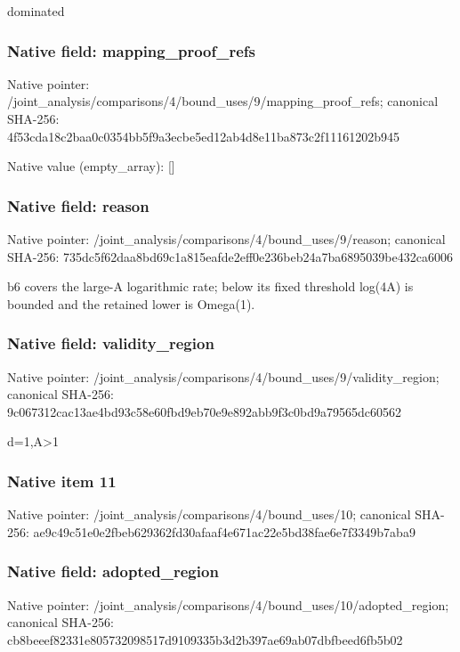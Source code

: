 \documentclass[10pt,a4paper]{article}
\begin{document}
\begingroup\raggedright\sloppy dominated\par\endgroup

\subsubsection{Native field: mapping\_\allowbreak{}proof\_\allowbreak{}refs}
Native pointer: /joint\_\allowbreak{}analysis/comparisons/4/bound\_\allowbreak{}uses/9/mapping\_\allowbreak{}proof\_\allowbreak{}refs; canonical SHA-256: 4f53cda18c2baa0c0354bb5f9a3ecbe5ed12ab4d8e11ba873c2f11161202b945

Native value (empty\_\allowbreak{}array): []

\subsubsection{Native field: reason}
Native pointer: /joint\_\allowbreak{}analysis/comparisons/4/bound\_\allowbreak{}uses/9/reason; canonical SHA-256: 735dc5f62daa8bd69c1a815eafde2eff0e236beb24a7ba6895039be432ca6006

\begingroup\raggedright\sloppy b6 covers the large-A logarithmic rate;\allowbreak{} below its fixed threshold log(4A) is bounded and the retained lower is Omega(1).\par\endgroup

\subsubsection{Native field: validity\_\allowbreak{}region}
Native pointer: /joint\_\allowbreak{}analysis/comparisons/4/bound\_\allowbreak{}uses/9/validity\_\allowbreak{}region; canonical SHA-256: 9c067312cac13ae4bd93c58e60fbd9eb70e9e892abb9f3c0bd9a79565dc60562

\begingroup\raggedright\sloppy d=\allowbreak{}1,\allowbreak{}A>1\par\endgroup

\subsubsection{Native item 11}
Native pointer: /joint\_\allowbreak{}analysis/comparisons/4/bound\_\allowbreak{}uses/10; canonical SHA-256: ae9c49c51e0e2fbeb629362fd30afaaf4e671ac22e5bd38fae6e7f3349b7aba9

\subsubsection{Native field: adopted\_\allowbreak{}region}
Native pointer: /joint\_\allowbreak{}analysis/comparisons/4/bound\_\allowbreak{}uses/10/adopted\_\allowbreak{}region; canonical SHA-256: cb8beeef82331e805732098517d9109335b3d2b397ae69ab07dbfbeed6fb5b02
\end{document}
